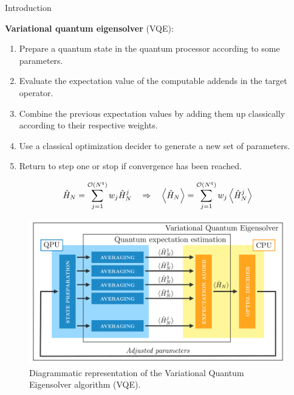 \documentclass[final]{beamer}
\newlength{\onecolwid}
\begin{document}
\begin{frame}[t]
\begin{columns}[t]
\begin{column}{\onecolwid}
\begin{block}{Introduction}

  \textbf{Variational quantum eigensolver} (VQE):
  \begin{enumerate}
    \item Prepare a quantum state in the quantum processor according to some parameters.
    \item Evaluate the expectation value of the computable addends in the target operator.
    \item Combine the previous expectation values by adding them up classically according to their respective weights.
    \item Use a classical optimization decider to generate a new set of parameters.
    \item Return to step one or stop if convergence has been reached.
  \end{enumerate}

  \begin{gather*} \label{eq:vqe-operator-averaging}
    \hat{H}_{N} = \sum_{j=1}^{\order{N^q}} w_{j} \hat{H}_{N}^{j} \qRa
    \ev{\hat{H}_{N}} = \sum_{j=1}^{\order{N^q}} w_{j} \ev{\hat{H}_{N}^{j}}
  \end{gather*}

  \vspace{1em}
  \begin{figure}
    \includegraphics[width=1.0\linewidth]{Figures/VQE.pdf}
    \caption{Diagrammatic representation of the Variational Quantum Eigensolver algorithm (VQE).}
  \end{figure}

\end{block}



\end{column}
\end{columns}
\end{frame}
\end{document}
